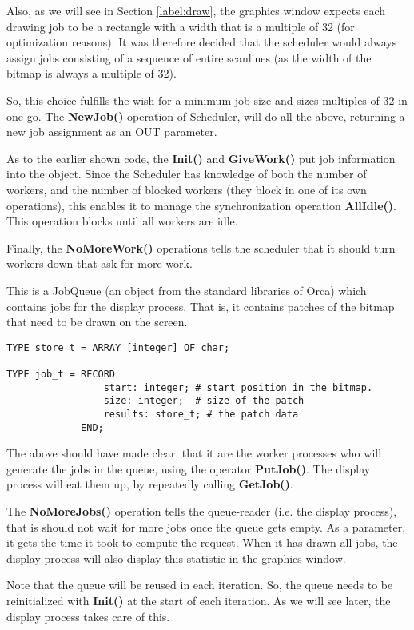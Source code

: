 Also, as we will see in Section \ref{label:draw}, the graphics window expects
each drawing job to be a rectangle with a width that is a multiple of 32 (for
optimization reasons). It was therefore decided that the scheduler would always
assign jobs consisting of a sequence of entire scanlines (as the width
of the bitmap is always a multiple of 32).  

So, this choice fulfills the wish for a minimum job size and sizes multiples
of 32 in one go. The {\bf NewJob()} operation of Scheduler, will do all
the above, returning a new job assignment as an OUT parameter.

As to the earlier shown code, the {\bf Init()} and {\bf GiveWork()} put 
job information into the object.
Since the Scheduler has knowledge of both the number of workers, and the 
number of blocked workers (they block in one of its own operations), 
this enables it to manage the synchronization operation {\bf AllIdle()}.
This operation blocks until all workers are idle.

Finally, the {\bf NoMoreWork()} operations tells the scheduler that it should 
turn workers down that ask for more work. 



This is a JobQueue (an object from the standard libraries of Orca) which
contains jobs for the display process. That is, it contains patches
of the bitmap that need to be drawn on the screen. 
\begin{verbatim}
TYPE store_t = ARRAY [integer] OF char;

TYPE job_t = RECORD
                 start: integer; # start position in the bitmap. 
                 size: integer;  # size of the patch
                 results: store_t; # the patch data
             END;
\end{verbatim}
The above should have made clear, that it are the worker processes who
will generate the jobs in the queue, using the operator {\bf PutJob()}.
The display process will eat them up, by repeatedly calling {\bf GetJob()}.

The {\bf NoMoreJobs()} operation tells the queue-reader (i.e. the display
process), that is should not wait for more jobs once the queue gets empty.
As a parameter, it gets the time it took to compute the request. When it
has drawn all jobs, the display process will also display this statistic
in the graphics window.

Note that the queue will be reused in each iteration. So, the 
queue needs to be reinitialized with {\bf Init()} at the start of each 
iteration. As we will see later, the display process takes care of this. 


